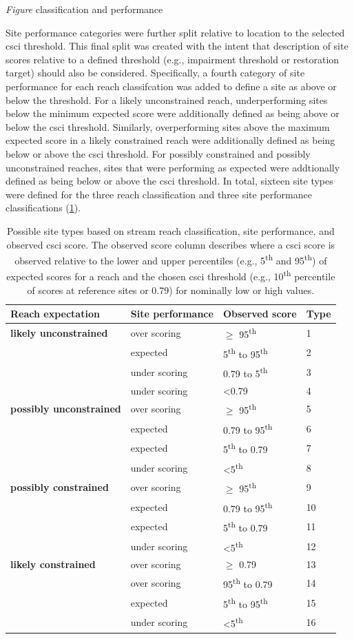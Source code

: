 \documentclass[]{article}
\begin{document}
\emph{Figure} classification and performance

Site performance categories were further split relative to location to
the selected \ac{csci} threshold. This final split was created with the
intent that description of site scores relative to a defined threshold
(e.g., impairment threshold or restoration target) should also be
considered. Specifically, a fourth category of site performance for each
reach classifcation was added to define a site as above or below the
threshold. For a likely unconstrained reach, underperforming sites below
the minimum expected score were additionally defined as being above or
below the \ac{csci} threshold. Similarly, overperforming sites above the
maximum expected score in a likely constrained reach were additionally
defined as being below or above the \ac{csci} threshold. For possibly
constrained and possibly unconstrained reaches, sites that were
performing as expected were addtionally defined as being below or above
the \ac{csci} threshold. In total, sixteen site types were defined for
the three reach classification and three site performance
classifications (\cref{tab:typetab}).

\begin{table}[!tbp]
\caption{Possible site types based on stream reach classification, site performance, and observed \ac{csci} score. The observed score column describes where a \ac{csci} score is observed relative to the lower and upper percentiles (e.g., 5\textsuperscript{th} and 95\textsuperscript{th}) of expected scores for a reach and the chosen \ac{csci} threshold (e.g., 10\textsuperscript{th} percentile of scores at reference sites or 0.79) for nominally low or high values.\label{tab:typetab}} 
\begin{center}
\begin{tabular}{llll}
\hline\hline
\multicolumn{1}{l}{Reach expectation}&\multicolumn{1}{c}{Site performance}&\multicolumn{1}{c}{Observed score}&\multicolumn{1}{c}{Type}\tabularnewline
\hline
\textbf{likely unconstrained}&over scoring&$\geq$ 95\textsuperscript{th}&1\tabularnewline
&expected&5\textsuperscript{th} to 95\textsuperscript{th}&2\tabularnewline
&under scoring&0.79 to 5\textsuperscript{th}&3\tabularnewline
&under scoring&\textless  0.79&4\tabularnewline
\textbf{possibly unconstrained}&over scoring&$\geq$ 95\textsuperscript{th}&5\tabularnewline
&expected&0.79 to 95\textsuperscript{th}&6\tabularnewline
&expected&5\textsuperscript{th} to 0.79&7\tabularnewline
&under scoring&\textless  5\textsuperscript{th}&8\tabularnewline
\textbf{possibly constrained}&over scoring&$\geq$ 95\textsuperscript{th}&9\tabularnewline
&expected&0.79 to 95\textsuperscript{th}&10\tabularnewline
&expected&5\textsuperscript{th} to 0.79&11\tabularnewline
&under scoring&\textless  5\textsuperscript{th}&12\tabularnewline
\textbf{likely constrained}&over scoring&$\geq$ 0.79&13\tabularnewline
&over scoring&95\textsuperscript{th} to 0.79&14\tabularnewline
&expected&5\textsuperscript{th} to 95\textsuperscript{th}&15\tabularnewline
&under scoring&\textless  5\textsuperscript{th}&16\tabularnewline
\hline
\end{tabular}\end{center}
\end{table}
\end{document}
